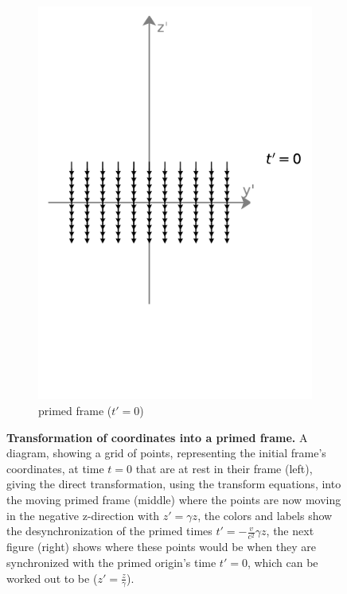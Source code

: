 \begin{figure}[H]
\begin{subfigure}{0.29\textwidth}
		\includegraphics[width=\textwidth]{images/pdf/coord_transform_primed_sychronised.pdf}
		\caption{primed frame (${t{'}}=0$)}
		\label{fig: coordinate transform subfig_3}
	\end{subfigure}
	\caption{\textbf{Transformation of coordinates into a primed frame.} A diagram, showing a grid of points, representing the initial frame's coordinates, at time ${t} = 0$ that are at rest in their frame (left), giving the direct transformation, using the transform equations, into the moving primed frame (middle) where the points are now moving in the negative z-direction with ${z{'}} = {\gamma} {z}$, the colors and labels show the desynchronization of the primed times ${t{'}} = -\frac{{v}}{{c}^2} {\gamma} {z}$, the next figure (right) shows where these points would be when they are synchronized with the primed origin's time ${t{'}} = 0$, which can be worked out to be (${z{'}} = \frac{{z}}{{\gamma}}$).}
	\label{fig: coordinate transform}
\end{figure}

